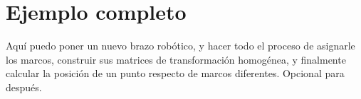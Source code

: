 \section{Ejemplo completo}
Aquí puedo poner un nuevo brazo robótico, y hacer todo el proceso de asignarle los marcos, construir sus matrices de transformación homogénea, y finalmente calcular la posición de un punto respecto de marcos diferentes. Opcional para después.
